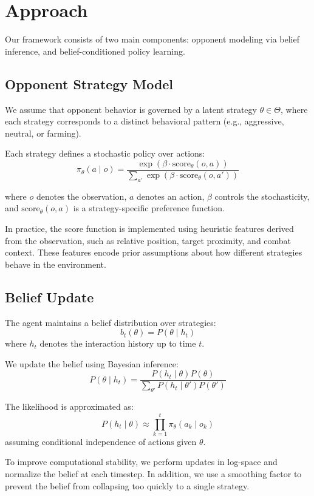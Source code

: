 \documentclass{article}
\begin{document}
\section{Approach}

Our framework consists of two main components: opponent modeling via belief inference, and belief-conditioned policy learning.

\subsection{Opponent Strategy Model}

We assume that opponent behavior is governed by a latent strategy $\theta \in \Theta$, where each strategy corresponds to a distinct behavioral pattern (e.g., aggressive, neutral, or farming).

Each strategy defines a stochastic policy over actions:
\[
\pi_\theta(a \mid o) = \frac{\exp(\beta \cdot \text{score}_\theta(o,a))}{\sum_{a'} \exp(\beta \cdot \text{score}_\theta(o,a'))}
\]

where $o$ denotes the observation, $a$ denotes an action, $\beta$ controls the stochasticity, and $\text{score}_\theta(o,a)$ is a strategy-specific preference function.

In practice, the score function is implemented using heuristic features derived from the observation, such as relative position, target proximity, and combat context. These features encode prior assumptions about how different strategies behave in the environment.

\subsection{Belief Update}

The agent maintains a belief distribution over strategies:
\[
b_t(\theta) = P(\theta \mid h_t)
\]
where $h_t$ denotes the interaction history up to time $t$.

We update the belief using Bayesian inference:
\[
P(\theta \mid h_t) = \frac{P(h_t \mid \theta) P(\theta)}{\sum_{\theta'} P(h_t \mid \theta') P(\theta')}
\]

The likelihood is approximated as:
\[
P(h_t \mid \theta) \approx \prod_{k=1}^{t} \pi_\theta(a_k \mid o_k)
\]
assuming conditional independence of actions given $\theta$.

To improve computational stability, we perform updates in log-space and normalize the belief at each timestep. In addition, we use a smoothing factor to prevent the belief from collapsing too quickly to a single strategy.
\end{document}
